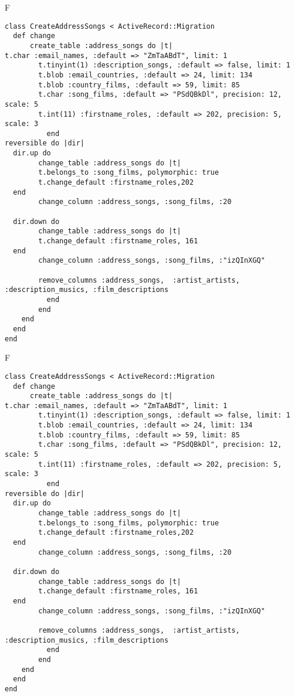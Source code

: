 F
\begin{verbatim}
class CreateAddressSongs < ActiveRecord::Migration
  def change
	  create_table :address_songs do |t|
t.char :email_names, :default => "ZmTaABdT", limit: 1
		t.tinyint(1) :description_songs, :default => false, limit: 1
		t.blob :email_countries, :default => 24, limit: 134
		t.blob :country_films, :default => 59, limit: 85
		t.char :song_films, :default => "PSdQBkDl", precision: 12, scale: 5
		t.int(11) :firstname_roles, :default => 202, precision: 5, scale: 3
		  end
reversible do |dir|
  dir.up do
		change_table :address_songs do |t|
		t.belongs_to :song_films, polymorphic: true
 		t.change_default :firstname_roles,202
  end
 		change_column :address_songs, :song_films, :20
   
  dir.down do
		change_table :address_songs do |t|
		t.change_default :firstname_roles, 161
  end
 		change_column :address_songs, :song_films, :"izQInXGQ"
   
		remove_columns :address_songs,  :artist_artists, :description_musics, :film_descriptions 
	      end
	    end
    end 
  end
end

\end{verbatim}

F
\begin{verbatim}
class CreateAddressSongs < ActiveRecord::Migration
  def change
	  create_table :address_songs do |t|
t.char :email_names, :default => "ZmTaABdT", limit: 1
		t.tinyint(1) :description_songs, :default => false, limit: 1
		t.blob :email_countries, :default => 24, limit: 134
		t.blob :country_films, :default => 59, limit: 85
		t.char :song_films, :default => "PSdQBkDl", precision: 12, scale: 5
		t.int(11) :firstname_roles, :default => 202, precision: 5, scale: 3
		  end
reversible do |dir|
  dir.up do
		change_table :address_songs do |t|
		t.belongs_to :song_films, polymorphic: true
 		t.change_default :firstname_roles,202
  end
 		change_column :address_songs, :song_films, :20
   
  dir.down do
		change_table :address_songs do |t|
		t.change_default :firstname_roles, 161
  end
 		change_column :address_songs, :song_films, :"izQInXGQ"
   
		remove_columns :address_songs,  :artist_artists, :description_musics, :film_descriptions 
	      end
	    end
    end 
  end
end

\end{verbatim}


